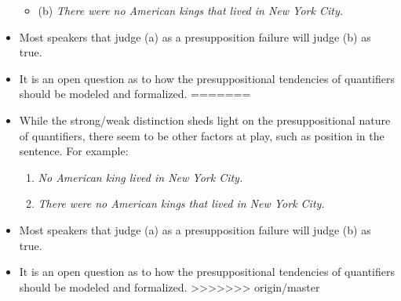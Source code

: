 \documentclass[a4paper]{article}
\begin{document}
\begin{itemize}
\begin{itemize}
\begin{itemize}
\end{itemize}
\item (b) \emph{There were no American kings that lived in New York City.}
\end{itemize}
\item Most speakers that judge (a) as a presupposition failure will judge (b) as true. 
\item It is an open question as to how the presuppositional tendencies of quantifiers should be modeled and formalized. 
=======
\item While the strong/weak distinction sheds light on the presuppositional nature of quantifiers, there seem to be other factors at play, such as position in the sentence. For example:
  \begin{enumerate}
  \item \emph{No American king lived in New York City.}
  \item \emph{There were no American kings that lived in New York City.}
  \end{enumerate}
\item Most speakers that judge (a) as a presupposition failure will judge (b) as true.
\item It is an open question as to how the presuppositional tendencies of quantifiers should be modeled and formalized.
>>>>>>> origin/master
\end{itemize}
\end{document}
